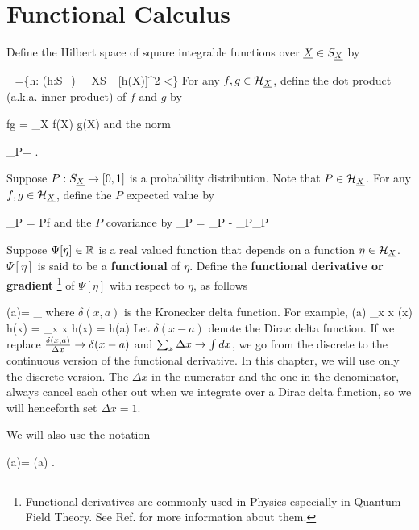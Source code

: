 \section{Functional Calculus}

Define
the Hilbert space of square integrable functions over ${\underline{X}}\in S_{\underline{X}}$
by

\beq
\calh_\rvX =\{h: (h:S_\rvX\rarrow \RR) 
\sum_{ X\in S_ \rvX}[h(X)]^2 <\infty\}
\eeq
For any $f,g\in {\cal H}_{\underline{X}}$,
define the dot product (a.k.a. inner product)
of $f$ and $g$ by

\beq
f\cdot g = \sum_X f(X) g(X)
\eeq
and the norm

\beq
{}_P= 
\;.
\eeq

Suppose $P:S_{\underline{X}}\rightarrow [0,1]$
is a probability distribution.
Note that $P\in{\cal H}_{\underline{X}}$.
For any $f,g\in{\cal H}_{\underline{X}}$,
define the $P$ expected value by

\beq
{}_P = P\cdot f
\eeq
and the $P$ covariance by
\beq
{}_P =
_P - _P_P
\eeq

Suppose $\Psi[\eta]\in{ \mathbb{R}}$
is a real valued function
that depends on a function $\eta\in {\cal H}_{\underline{X}}$.
$\Psi[\eta]$ is said to be a {\bf functional} of $\eta$.
Define the
{\bf functional derivative or gradient }\footnote{
Functional derivatives are commonly used in Physics
especially in Quantum Field Theory.
See Ref.\cite{wiki-func-deri} for more
information about them.}
of $\Psi[\eta]$ with respect to $\eta$, as follows


\beq
\frac{\delta \Psi[\eta]}
{\delta \eta(a)}=
\lim_{\eps{}}
{\eps}
\eeq
where $\delta(x,a)$ is the Kronecker delta function.
For example,
\beq
\frac{\delta}
{\delta \eta(a)}
\sum_x \Delta x\; \eta(x) h(x)
=
\sum_x \Delta x  h(x)
=
h(a)
\eeq
 Let
$\delta(x-a)$ denote the Dirac delta function. If we replace
$\frac{\delta(x,a)}{\Delta x}\rightarrow\delta(x-a)$
and $\sum_x \Delta x\rightarrow \int dx$, we go
from the discrete to the continuous version
of the functional derivative.
In this chapter, we will use only the discrete version.
The $\Delta x$ in the numerator
and the one in the denominator, always cancel
each other out
when we integrate over a Dirac delta function, so we will
henceforth set
$\Delta x=1$.

We will also use the notation

\beq
\dpsi[\eta](a)=
\frac{\delta \Psi[\eta]}
{\delta \eta(a)}
\;.
\eeq

